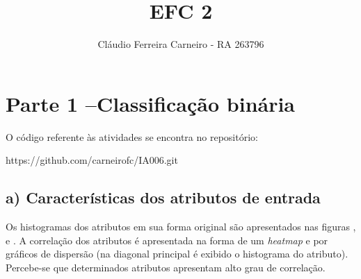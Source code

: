 \documentclass{article}
\author{Cláudio Ferreira Carneiro - RA 263796}
\title{EFC 2}
\begin{document}
    \maketitle
    \newpage
    \section[]{Parte 1 –Classificação binária}
    O código referente às atividades se encontra no repositório:
    
    https://github.com/carneirofc/IA006.git\linebreak
    \subsection[]{a) Características dos atributos de entrada}
        Os histogramas dos atributos em sua forma original são apresentados nas figuras ,
         e . A correlação dos atributos é apresentada
        na forma de um \textit{heatmap}  e por gráficos de dispersão 
        (na diagonal principal é exibido o histograma do atributo).
        Percebe-se que determinados atributos apresentam alto grau de correlação.
        
\end{document}
